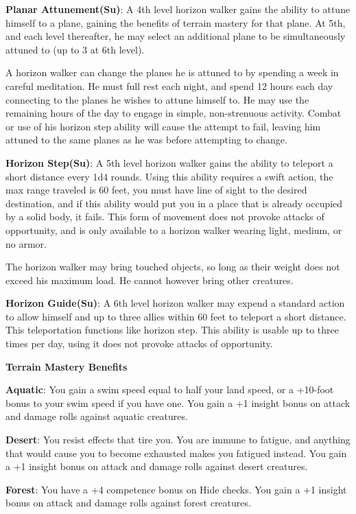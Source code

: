 \textbf{Planar Attunement(Su)}: A 4th level horizon walker gains the ability to attune himself to a plane, gaining the benefits of terrain mastery for that plane. At 5th, and each level thereafter, he may select an additional plane to be simultaneously attuned to (up to 3 at 6th level).

A horizon walker can change the planes he is attuned to by spending a week in careful meditation. He must full rest each night, and spend 12 hours each day connecting to the planes he wishes to attune himself to. He may use the remaining hours of the day to engage in simple, non-strenuous activity. Combat or use of his horizon step ability will cause the attempt to fail, leaving him attuned to the same planes as he was before attempting to change.

\textbf{Horizon Step(Su)}: A 5th level horizon walker gains the ability to teleport a short distance every 1d4 rounds. Using this ability requires a swift action, the max range traveled is 60 feet, you must have line of sight to the desired destination, and if this ability would put you in a place that is already occupied by a solid body, it fails. This form of movement does not provoke attacks of opportunity, and is only available to a horizon walker wearing light, medium, or no armor.

The horizon walker may bring touched objects, so long as their weight does not exceed his maximum load. He cannot however bring other creatures.

\textbf{Horizon Guide(Su)}: A 6th level horizon walker may expend a standard action to allow himself and up to three allies within 60 feet to teleport a short distance. This teleportation functions like horizon step. This ability is usable up to three times per day, using it does not provoke attacks of opportunity.

\textbf{\large{Terrain Mastery Benefits}}

\textbf{Aquatic}: You gain a swim speed equal to half your land speed, or a +10-foot bonus to your swim speed if you have one. You gain a +1 insight bonus on attack and damage rolls against aquatic creatures.

\textbf{Desert}: You resist effects that tire you. You are immune to fatigue, and anything that would cause you to become exhausted makes you fatigued instead. You gain a +1 insight bonus on attack and damage rolls against desert creatures.

\textbf{Forest}: You have a +4 competence bonus on Hide checks. You gain a +1 insight bonus on attack and damage rolls against forest creatures.

